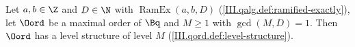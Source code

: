Let $a,b\in\Z$ and $D\in\N$ with $\operatorname{RamEx}(a,b,D)$ (\cref{III.qalg.def:ramified-exactly}), let $\Oord$ be a maximal order of
$\Bq$ and $M\ge1$ with $\gcd(M,D)=1$. Then $\Oord$ has a level structure of level $M$ (\cref{III.qord.def:level-structure}).
